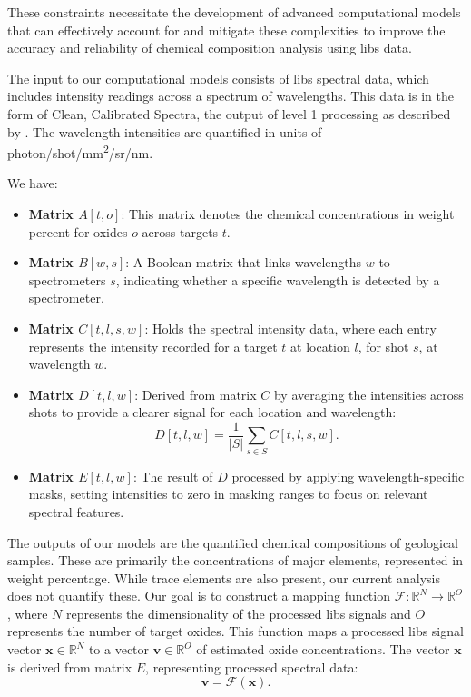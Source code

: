 These constraints necessitate the development of advanced computational models that can effectively account for and mitigate these complexities to improve the accuracy and reliability of chemical composition analysis using \gls{libs} data.

The input to our computational models consists of \gls{libs} spectral data, which includes intensity readings across a spectrum of wavelengths. This data is in the form of Clean, Calibrated Spectra\cite{andersonImprovedAccuracyQuantitative2017}, the output of level 1 processing as described by \citet{wiensPreflightCalibrationInitial2013}. The wavelength intensities are quantified in units of photon/shot/mm\textsuperscript{2}/sr/nm.

We have:

\begin{itemize}
    \item \textbf{Matrix $A[t, o]$}: This matrix denotes the chemical concentrations in weight percent for oxides $o$ across targets $t$.
    \item \textbf{Matrix $B[w, s]$}: A Boolean matrix that links wavelengths $w$ to spectrometers $s$, indicating whether a specific wavelength is detected by a spectrometer.
    \item \textbf{Matrix $C[t, l, s, w]$}: Holds the spectral intensity data, where each entry represents the intensity recorded for a target $t$ at location $l$, for shot $s$, at wavelength $w$.
    \item \textbf{Matrix $D[t, l, w]$}: Derived from matrix $C$ by averaging the intensities across shots to provide a clearer signal for each location and wavelength:
    \[
    D[t, l, w] = \frac{1}{|S|} \sum_{s \in S} C[t, l, s, w].
    \]
    \item \textbf{Matrix $E[t, l, w]$}: The result of $D$ processed by applying wavelength-specific masks, setting intensities to zero in masking ranges to focus on relevant spectral features.
\end{itemize}

The outputs of our models are the quantified chemical compositions of geological samples. These are primarily the concentrations of major elements, represented in weight percentage. While trace elements are also present, our current analysis does not quantify these.
Our goal is to construct a mapping function $\mathcal{F}: \mathbb{R}^N \rightarrow \mathbb{R}^O$, where $N$ represents the dimensionality of the processed \gls{libs} signals and $O$ represents the number of target oxides. This function maps a processed \gls{libs} signal vector $\mathbf{x} \in \mathbb{R}^N$ to a vector $\mathbf{v} \in \mathbb{R}^O$ of estimated oxide concentrations. The vector $\mathbf{x}$ is derived from matrix $E$, representing processed spectral data:
\[
\mathbf{v} = \mathcal{F}(\mathbf{x}).
\]

